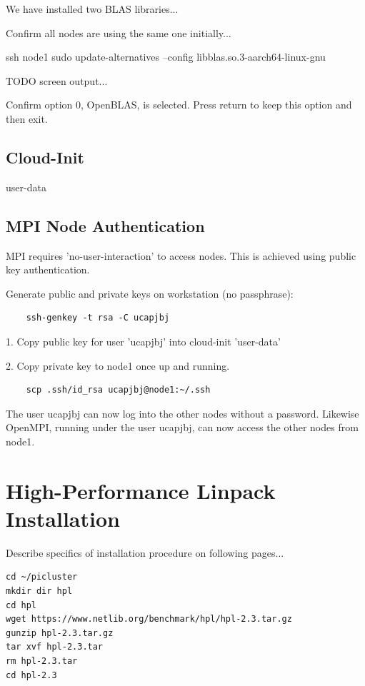 \documentclass{article}
\begin{document}
We have installed two BLAS libraries...

Confirm all nodes are using the same one initially...

ssh node1
sudo update-alternatives --config libblas.so.3-aarch64-linux-gnu

TODO screen output...

Confirm option 0, OpenBLAS, is selected. Press return to keep this option and then exit.





\subsection{Cloud-Init}
user-data

\subsection{MPI Node Authentication}
MPI requires 'no-user-interaction' to access nodes. This is achieved using public key authentication.

Generate public and private keys on workstation (no passphrase):
\begin{verbatim}
    ssh-genkey -t rsa -C ucapjbj
\end{verbatim}

1. Copy public key for user 'ucapjbj' into cloud-init 'user-data'

2. Copy private key to node1 once up and running.
\begin{verbatim}
    scp .ssh/id_rsa ucapjbj@node1:~/.ssh
\end{verbatim}

The user ucapjbj can now log into the other nodes without a password. Likewise OpenMPI, running under the user ucapjbj, can now access the other nodes from node1.


\clearpage\section{High-Performance Linpack Installation}
Describe specifics of installation procedure on following pages...

\begin{verbatim}
cd ~/picluster
mkdir dir hpl
cd hpl
wget https://www.netlib.org/benchmark/hpl/hpl-2.3.tar.gz
gunzip hpl-2.3.tar.gz
tar xvf hpl-2.3.tar
rm hpl-2.3.tar
cd hpl-2.3
\end{verbatim}
\end{document}
